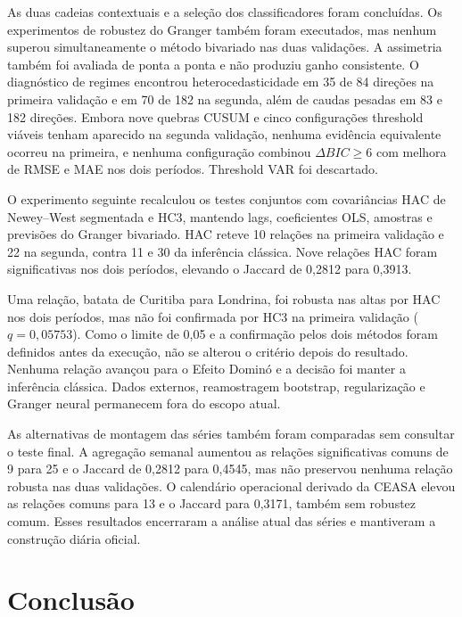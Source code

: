 \documentclass[12pt,a4paper]{article}
\begin{document}
As duas cadeias contextuais e a seleção dos classificadores foram concluídas.
Os experimentos de robustez do Granger também foram executados, mas nenhum
superou simultaneamente o método bivariado nas duas validações. A assimetria
também foi avaliada de ponta a ponta e não produziu ganho consistente. O
diagnóstico de regimes encontrou heterocedasticidade em 35 de 84 direções na
primeira validação e em 70 de 182 na segunda, além de caudas pesadas em 83 e
182 direções. Embora nove quebras CUSUM e cinco configurações threshold viáveis
tenham aparecido na segunda validação, nenhuma evidência equivalente ocorreu na
primeira, e nenhuma configuração combinou $\Delta BIC \geq 6$ com melhora de
RMSE e MAE nos dois períodos. Threshold VAR foi descartado.

O experimento seguinte recalculou os testes conjuntos com covariâncias HAC de
Newey--West segmentada e HC3, mantendo lags, coeficientes OLS, amostras e
previsões do Granger bivariado. HAC reteve 10 relações na primeira validação e
22 na segunda, contra 11 e 30 da inferência clássica. Nove relações HAC foram
significativas nos dois períodos, elevando o Jaccard de 0,2812 para 0,3913.

Uma relação, batata de Curitiba para Londrina, foi robusta nas altas por HAC nos
dois períodos, mas não foi confirmada por HC3 na primeira validação
($q=0,05753$). Como o limite de 0,05 e a confirmação pelos dois métodos foram
definidos antes da execução, não se alterou o critério depois do resultado.
Nenhuma relação avançou para o Efeito Dominó e a decisão foi manter a inferência
clássica. Dados externos, reamostragem bootstrap, regularização e Granger neural
permanecem fora do escopo atual.

As alternativas de montagem das séries também foram comparadas sem consultar o
teste final. A agregação semanal aumentou as relações significativas comuns de
9 para 25 e o Jaccard de 0,2812 para 0,4545, mas não preservou nenhuma relação
robusta nas duas validações. O calendário operacional derivado da CEASA elevou
as relações comuns para 13 e o Jaccard para 0,3171, também sem robustez comum.
Esses resultados encerraram a análise atual das séries e mantiveram a
construção diária oficial.


\section{Conclusão}
\end{document}
